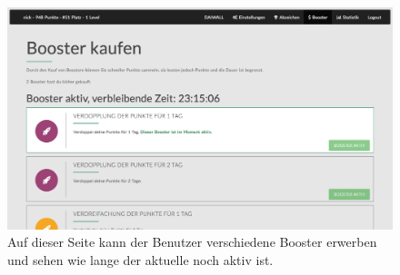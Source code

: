 \documentclass[12pt,twoside]{book}
\begin{document}
\begin{figure}[h]
    \centering
    \includegraphics[width=1.0\textwidth]{images/infoboard_booster.png}
    \caption{Auf dieser Seite kann der Benutzer verschiedene Booster erwerben und sehen wie lange der aktuelle noch aktiv ist.}
    \label{fig:booster}
\end{figure}
\end{document}
